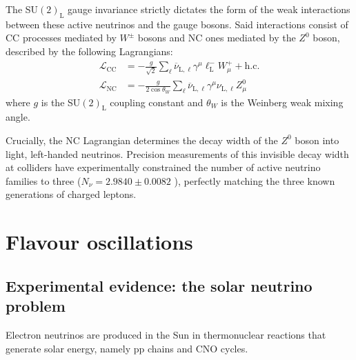 The SU$(2)_\text{L}$ gauge invariance strictly dictates the form of the weak interactions between these active neutrinos and the gauge 
bosons. Said interactions consist of \ac{CC} processes mediated by $W^\pm$ bosons and \ac{NC} ones mediated by the $Z^0$ boson, 
described by the following Lagrangians:
\begin{equation}
    \label{eq:SM-neutrino-lagrangian}
    \begin{aligned}
        \mathcal{L}_\text{CC} &= - \frac{g}{\sqrt{2}} \sum_{\ell} \overline{\nu}_{\text{L},\ell} \gamma^\mu \ell_\text{L}^- W_\mu^+ + \text{h.c.} \\
        \mathcal{L}_\text{NC} &= - \frac{g}{2 \cos \theta_W} \sum_{\ell} \overline{\nu}_{\text{L},\ell} \gamma^\mu \nu_{\text{L},\ell} Z_\mu^0
    \end{aligned}
\end{equation}
where $g$ is the SU$(2)_\text{L}$ coupling constant and $\theta_W$ is the Weinberg weak mixing angle. 

Crucially, the \ac{NC} Lagrangian determines the decay width of the $Z^0$ boson into light, left-handed neutrinos. 
Precision measurements of this invisible decay width at colliders have experimentally constrained the number of active neutrino 
families to three ($N_\nu = 2.9840 \pm 0.0082$ \cite{LEPnumberOFnu}), perfectly matching the three known generations of charged leptons.

\section{Flavour oscillations}

\subsection[Experimental evidence: the solar neutrinos problem]{Experimental evidence: the solar neutrino problem\footnotemark}
\label{subsec:oscillation-experiments}
Electron neutrinos are produced in the Sun in thermonuclear reactions that generate solar energy, namely \ac{pp} chains and \ac{CNO} cycles.

